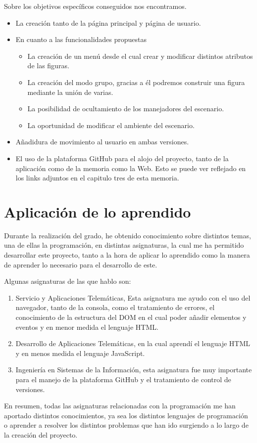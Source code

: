 \documentclass[a4paper, 12pt]{book}
\begin{document}
Sobre los objetivos específicos conseguidos nos encontramos. 
\begin{itemize}
    \item La creación tanto de la página principal y página de usuario.
    \item En cuanto a las funcionalidades propuestas
    \begin{itemize}
        \item La creación de un menú desde el cual crear y modificar distintos atributos de las figuras.
        \item La creación del modo grupo, gracias a él podremos construir una figura mediante la unión de varias.
        \item La posibilidad de ocultamiento de los manejadores del escenario.
        \item La oportunidad de modificar el ambiente del escenario.
    \end{itemize}
    \item Añadidura de movimiento al usuario en ambas versiones.
    \item El uso de la plataforma GitHub para el alojo del proyecto, tanto de la aplicación como de la memoria como la Web. Esto se puede ver reflejado en los links adjuntos en el capitulo tres de esta memoria.
\end{itemize}

\section{Aplicación de lo aprendido}
\label{sec:aplicacion}

Durante la realización del grado, he obtenido conocimiento sobre distintos temas, una de ellas la programación, en distintas asignaturas, la cual me ha permitido desarrollar este proyecto, tanto a la hora de aplicar lo aprendido como la manera de aprender lo necesario para el desarrollo de este.

Algunas asignaturas de las que hablo son:
\begin{enumerate}  
\item Servicio y Aplicaciones Telemáticas, Esta asignatura me ayudo con el uso del navegador, tanto de la consola, como el tratamiento de errores, el conocimiento de la estructura del DOM en el cual poder añadir elementos y eventos y en menor medida el lenguaje HTML.
  \item Desarrollo de Aplicaciones Telemáticas, en la cual aprendí el lenguaje HTML y en menos medida el lenguaje JavaScript.
  \item Ingeniería en Sistemas de la Información, esta asignatura fue muy importante para el manejo de la plataforma GitHub y el tratamiento de control de versiones.
\end{enumerate}
En resumen, todas las asignaturas relacionadas con la programación me han aportado distintos conocimientos, ya sea los distintos lenguajes de programación o aprender a resolver los distintos problemas que han ido surgiendo a lo largo de la creación del proyecto.
\end{document}
